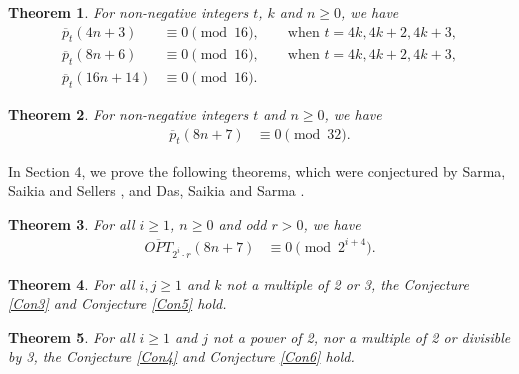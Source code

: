 \documentclass[12pt,reqno,a4paper]{amsart}
\newtheorem{theorem}{Theorem}[section]
\numberwithin{equation}{section}
\begin{document}
\begin{theorem}\label{T3}
For non-negative integers $t$, $k$ and $n\geq 0$, we have
\begin{align}
 \label{C8}  \overline{p}_{t}(4n+3)& \equiv 0 \pmod{16}, \qquad\text{when $t=4k,4k+2,4k+3,$}\\    
\label{C6}  \overline{p}_{t}(8n+6)& \equiv 0 \pmod{16}, \qquad\text{when $t=4k,4k+2,4k+3,$}\\
\label{C16} \overline{p}_{t}(16n+14)& \equiv 0 \pmod{16}.
 \end{align}
 \end{theorem}
\begin{theorem}\label{T4} For non-negative integers $t$ and $n\geq0$, we have
    \begin{align}
         \label{C9} \overline{p}_{t}(8n+7)& \equiv 0 \pmod{32}.
    \end{align}
\end{theorem}
In Section 4, we prove the following theorems, which were conjectured by Sarma, Saikia and Sellers \cite{saikiasarma}, and Das, Saikia and Sarma \cite{DSS}.
\begin{theorem}\label{T11} For all $i\geq 1$, $n\geq 0$ and odd $r>0$, we have
\begin{align*}
\overline{OPT}_{2^i\cdot r}(8n+7)& \equiv 0 \pmod{2^{i+4}}.
\end{align*}
\end{theorem}
\begin{theorem}\label{tt1}
For all $i,j\geq 1$ and $k$ not a multiple of 2 or 3, the Conjecture \ref{Con3} and Conjecture \ref{Con5} hold.
\end{theorem}
\begin{theorem}\label{tt2}
 For all $i\geq 1$ and $j$ not a power of 2,  nor a multiple of 2 or divisible by 3, the Conjecture \ref{Con4} and Conjecture \ref{Con6} hold.
\end{theorem}
\end{document}
